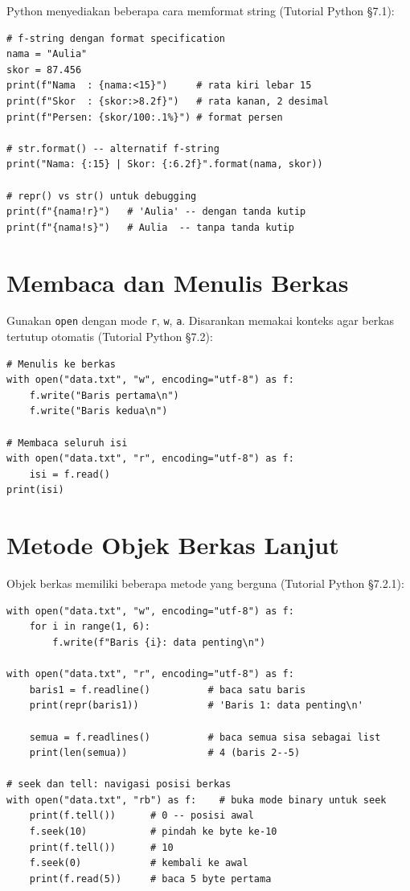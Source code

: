 \documentclass[../main.tex]{subfiles}
\begin{document}
Python menyediakan beberapa cara memformat string (Tutorial Python §7.1):

\begin{lstlisting}[caption=Format string: f-string dan format() (Tutorial Python ss7.1)]
# f-string dengan format specification
nama = "Aulia"
skor = 87.456
print(f"Nama  : {nama:<15}")     # rata kiri lebar 15
print(f"Skor  : {skor:>8.2f}")   # rata kanan, 2 desimal
print(f"Persen: {skor/100:.1%}") # format persen

# str.format() -- alternatif f-string
print("Nama: {:15} | Skor: {:6.2f}".format(nama, skor))

# repr() vs str() untuk debugging
print(f"{nama!r}")   # 'Aulia' -- dengan tanda kutip
print(f"{nama!s}")   # Aulia  -- tanpa tanda kutip
\end{lstlisting}

\section{Membaca dan Menulis Berkas}

Gunakan \texttt{open} dengan mode \texttt{r}, \texttt{w}, \texttt{a}. Disarankan memakai konteks  agar berkas tertutup otomatis (Tutorial Python §7.2):

\begin{lstlisting}[caption=Menulis dan membaca berkas]
# Menulis ke berkas
with open("data.txt", "w", encoding="utf-8") as f:
    f.write("Baris pertama\n")
    f.write("Baris kedua\n")

# Membaca seluruh isi
with open("data.txt", "r", encoding="utf-8") as f:
    isi = f.read()
print(isi)
\end{lstlisting}

\section{Metode Objek Berkas Lanjut}

Objek berkas memiliki beberapa metode yang berguna (Tutorial Python §7.2.1):

\begin{lstlisting}[caption=Metode berkas: readline readlines seek tell]
with open("data.txt", "w", encoding="utf-8") as f:
    for i in range(1, 6):
        f.write(f"Baris {i}: data penting\n")

with open("data.txt", "r", encoding="utf-8") as f:
    baris1 = f.readline()          # baca satu baris
    print(repr(baris1))            # 'Baris 1: data penting\n'

    semua = f.readlines()          # baca semua sisa sebagai list
    print(len(semua))              # 4 (baris 2--5)

# seek dan tell: navigasi posisi berkas
with open("data.txt", "rb") as f:    # buka mode binary untuk seek
    print(f.tell())      # 0 -- posisi awal
    f.seek(10)           # pindah ke byte ke-10
    print(f.tell())      # 10
    f.seek(0)            # kembali ke awal
    print(f.read(5))     # baca 5 byte pertama
\end{lstlisting}
\end{document}
